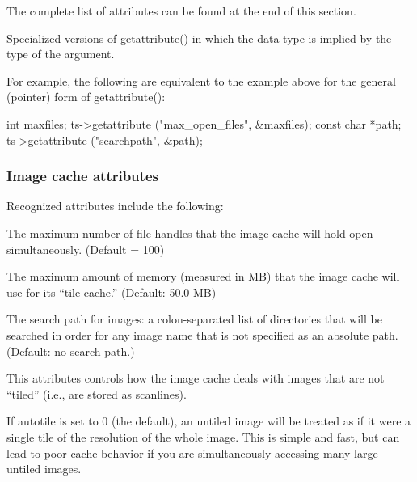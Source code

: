 The complete list of attributes can be found at the end of this section.


\apiend

Specialized versions of {\cf getattribute()} in which the data type is
implied by the type of the argument.

For example, the following are equivalent to the example above for the
general (pointer) form of {\cf getattribute()}:

\begin{code}
      int maxfiles;
      ts->getattribute ("max_open_files", &maxfiles);
      const char *path;
      ts->getattribute ("searchpath", &path);
\end{code}

\apiend


\subsubsection*{Image cache attributes}

Recognized attributes include the following:

The maximum number of file handles that the image cache will
hold open simultaneously.  (Default = 100)
\apiend

The maximum amount of memory (measured in MB) that the image cache
will use for its ``tile cache.'' (Default: 50.0 MB)
\apiend

The search path for images: a colon-separated list of
directories that will be searched in order for any image name
that is not specified as an absolute path. (Default: no search path.)
\apiend

This attributes controls how the image cache deals with images that
are not ``tiled'' (i.e., are stored as scanlines). 

If {\cf autotile} is set to 0 (the default), an untiled image will be
treated as if it were a single tile of the resolution of the whole
image.  This is simple and fast, but can lead to poor cache behavior if
you are simultaneously accessing many large untiled images.

